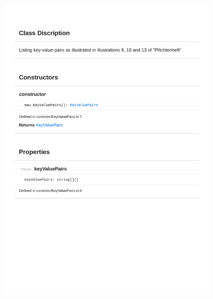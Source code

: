 \begin{figure}[H]
\centerline{\includegraphics[width=1\textwidth]{FrontendDocsAsPDF/Model/KeyValuePairs.pdf}}
\end{figure}

